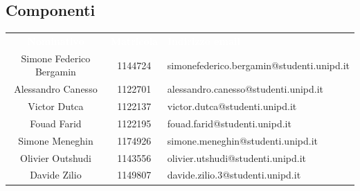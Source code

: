 \subsection{Componenti}
\begin{table}[H]	
	\begin{center}
	\begin{tabular}{ c c C{8cm} }
		\textcolor{white}{\textbf{Nominativo}} & \textcolor{white}{\textbf{Matricola}} & \textcolor{white}{\textbf{Indirizzo email}} \\
		Simone Federico Bergamin & 1144724  & simonefederico.bergamin@studenti.unipd.it \\
		Alessandro Canesso & 1122701 & alessandro.canesso@studenti.unipd.it\\
		Victor Dutca & 1122137 & victor.dutca@studenti.unipd.it\\
		Fouad Farid & 1122195 & fouad.farid@studenti.unipd.it\\
		Simone Meneghin & 1174926 & simone.meneghin@studenti.unipd.it\\
		Olivier Outshudi & 1143556 & olivier.utshudi@studenti.unipd.it\\
		Davide Zilio & 1149807 & davide.zilio.3@studenti.unipd.it\\
	\end{tabular}
	\end{center}
\end{table}